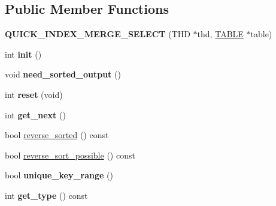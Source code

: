 \subsection*{Public Member Functions}
\begin{DoxyCompactItemize}
\item 
\mbox{\label{classQUICK__INDEX__MERGE__SELECT_ace542de79359bcc9e24d4489c377ce3a}} 
{\bfseries Q\+U\+I\+C\+K\+\_\+\+I\+N\+D\+E\+X\+\_\+\+M\+E\+R\+G\+E\+\_\+\+S\+E\+L\+E\+CT} (T\+HD $\ast$thd, \mbox{\hyperlink{structTABLE}{T\+A\+B\+LE}} $\ast$table)
\item 
\mbox{\label{classQUICK__INDEX__MERGE__SELECT_abe7ab3cfb7002204b9247c196d699c43}} 
int {\bfseries init} ()
\item 
\mbox{\label{classQUICK__INDEX__MERGE__SELECT_a34d444a46739f9134cea4c0091e28233}} 
void {\bfseries need\+\_\+sorted\+\_\+output} ()
\item 
\mbox{\label{classQUICK__INDEX__MERGE__SELECT_a77676b4c37055c02642ac187dd1eda13}} 
int {\bfseries reset} (void)
\item 
\mbox{\label{classQUICK__INDEX__MERGE__SELECT_a76ea32885f8e77c00ec96af9a8c32b67}} 
int {\bfseries get\+\_\+next} ()
\item 
bool \mbox{\hyperlink{classQUICK__INDEX__MERGE__SELECT_a36c1099e21429d7255000f67e4d3672f}{reverse\+\_\+sorted}} () const
\item 
bool \mbox{\hyperlink{classQUICK__INDEX__MERGE__SELECT_a38057df021af679b810f39d5f0619161}{reverse\+\_\+sort\+\_\+possible}} () const
\item 
\mbox{\label{classQUICK__INDEX__MERGE__SELECT_a43232088da7ac752c617d442afdcebc8}} 
bool {\bfseries unique\+\_\+key\+\_\+range} ()
\item 
\mbox{\label{classQUICK__INDEX__MERGE__SELECT_aad9a53c3ccc7b027a5c5a1866aebc2d7}} 
int {\bfseries get\+\_\+type} () const
\item 
\mbox{\label{classQUICK__INDEX__MERGE__SELECT_a45180cbc597ceb8ba5d35633c05d3c29}} 

\end{DoxyCompactItemize}
